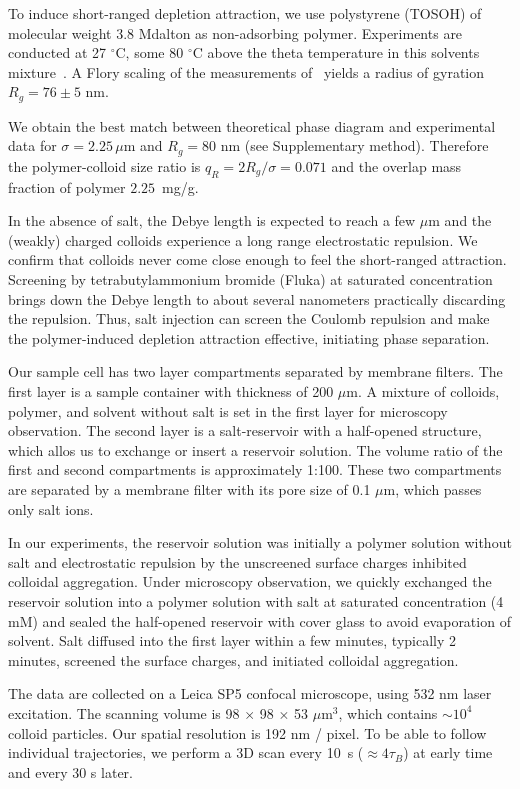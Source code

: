 \documentclass[preprint,amsmath,amssymb,superscriptaddress]{revtex4-1}
\begin{document}
To induce short-ranged depletion attraction, we use polystyrene (TOSOH) of molecular weight 3.8 Mdalton as non-adsorbing polymer.
Experiments are conducted at 27 $^\circ$C, some 80 $^\circ$C above the theta temperature in this solvents mixture~\cite{Royall2007}. A Flory scaling of the measurements of~\cite{lu2008gelation} yields a radius of gyration $R_g=76\pm5$ nm.

We obtain the best match between theoretical phase diagram and experimental data for $\sigma=2.25\,\mu$m and $R_g=80$ nm (see Supplementary method). Therefore the polymer-colloid size ratio is $q_R=2R_g/\sigma=0.071$ and the overlap mass fraction of polymer $2.25$~mg/g.

In the absence of salt, the Debye length is expected to reach a few $\mu$m and the (weakly) charged colloids experience a long range electrostatic repulsion. We confirm that colloids never come close enough to feel the short-ranged attraction. Screening by tetrabutylammonium bromide (Fluka) at saturated concentration brings down the Debye length to about several nanometers practically discarding the repulsion. 
Thus, salt injection can screen the Coulomb repulsion and make the polymer-induced depletion attraction effective, initiating phase separation. 

Our sample cell has two layer compartments separated by membrane filters. The first layer is a sample container with thickness of 200 $\mu$m. A mixture of colloids, polymer, and solvent without salt is  set in the first layer for microscopy observation. The second layer is a salt-reservoir with a half-opened structure, which allos us to exchange or insert a reservoir solution. The volume ratio of the first and second compartments is approximately 1:100. These two compartments are separated by a membrane filter with its pore size of 0.1 $\mu$m, which passes only salt ions. 

In our experiments, the reservoir solution was initially a polymer solution without salt and electrostatic repulsion by the unscreened surface charges inhibited colloidal aggregation. Under microscopy observation, we quickly exchanged the reservoir solution into a polymer solution with salt at saturated concentration (4 mM) and sealed the half-opened reservoir with cover glass to avoid evaporation of solvent. Salt diffused into the first layer within a few minutes, typically 2 minutes, screened the surface charges, and initiated colloidal aggregation. 

The data are collected on a Leica SP5 confocal microscope, using 532 nm laser excitation. The scanning volume is 98 $\times$ 98 $\times$ 53 $\mu$m$^3$, which contains $\sim 10^4$ colloid particles. Our spatial resolution is 192 nm / pixel. To be able to follow individual trajectories, we perform a 3D scan every 10~s ($\approx 4\tau_B$) at early time and every 30 s later.
\end{document}

